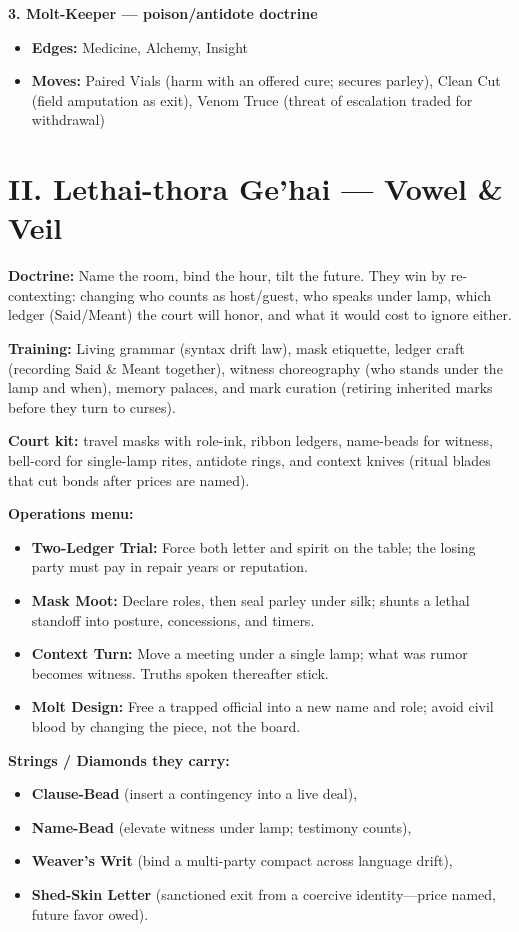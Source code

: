 \documentclass[11pt]{article}
\begin{document}
  \textbf{3. Molt-Keeper --- poison/antidote doctrine}
  \begin{itemize}
  \item \textbf{Edges:} Medicine, Alchemy, Insight
  \item \textbf{Moves:} Paired Vials (harm with an offered cure; secures parley), Clean Cut (field amputation as exit), Venom Truce (threat of escalation traded for withdrawal)
  \end{itemize}
  
  \newpage
  
  \section*{II. Lethai-thora Ge'hai --- Vowel \& Veil}
  
  \textbf{Doctrine:} Name the room, bind the hour, tilt the future. They win by re-contexting: changing who counts as host/guest, who speaks under lamp, which ledger (Said/Meant) the court will honor, and what it would cost to ignore either.
  
  \textbf{Training:} Living grammar (syntax drift law), mask etiquette, ledger craft (recording Said \& Meant together), witness choreography (who stands under the lamp and when), memory palaces, and mark curation (retiring inherited marks before they turn to curses).
  
  \textbf{Court kit:} travel masks with role-ink, ribbon ledgers, name-beads for witness, bell-cord for single-lamp rites, antidote rings, and context knives (ritual blades that cut bonds after prices are named).
  
  \textbf{Operations menu:}
  \begin{itemize}
  \item \textbf{Two-Ledger Trial:} Force both letter and spirit on the table; the losing party must pay in repair years or reputation.
  \item \textbf{Mask Moot:} Declare roles, then seal parley under silk; shunts a lethal standoff into posture, concessions, and timers.
  \item \textbf{Context Turn:} Move a meeting under a single lamp; what was rumor becomes witness. Truths spoken thereafter stick.
  \item \textbf{Molt Design:} Free a trapped official into a new name and role; avoid civil blood by changing the piece, not the board.
  \end{itemize}
  
  \textbf{Strings / Diamonds they carry:}
  \begin{itemize}
  \item \textbf{Clause-Bead} (insert a contingency into a live deal),
  \item \textbf{Name-Bead} (elevate witness under lamp; testimony counts),
  \item \textbf{Weaver's Writ} (bind a multi-party compact across language drift),
  \item \textbf{Shed-Skin Letter} (sanctioned exit from a coercive identity---price named, future favor owed).
  \end{itemize}
  
\end{document}
